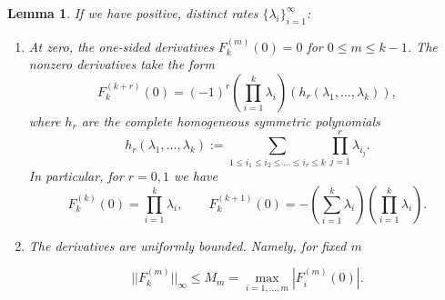 \documentclass[10pt,oneside,reqno]{article}
\theoremstyle{plain}
\newtheorem{lemma}[theorem]{Lemma}
\theoremstyle{definition}
\numberwithin{equation}{section}
\renewcommand{\leq}{\leqslant}
\begin{document}
\begin{lemma}
    If we have positive, distinct rates $\{\lambda_i\}_{i = 1}^\infty$:

    \begin{enumerate}[label=(\roman*)]
        \item At zero, the one-sided derivatives $F_k^{(m)}(0) = 0$ for $0 \leq m \leq k-1$. The nonzero derivatives take the form
        \[F_{k}^{{(k + r)}}(0) = (-1)^r \left(\prod_{i=1}^k \lambda_i\right) \left(h_r(\lambda_1,..., \lambda_k)\right),\]
        \noindent where $h_r$ are the complete homogeneous symmetric polynomials
        \[ h_r(\lambda_1, ..., \lambda_k) := \sum_{1\leq i_1\leq i_2 \leq ...\leq i_r\leq k} \prod_{j=1}^r \lambda_{i_j}.\]
        \noindent In particular, for $r=0, 1$ we have
            \[F_k^{(k)}(0) = \prod_{i=1}^k \lambda_i, \qquad F_k^{(k+1)}(0) = -\left(\sum_{i=1}^k \lambda_i\right)\left(\prod_{i=1}^k \lambda_i\right).\]
        \item The derivatives are uniformly bounded. Namely, for fixed $m$
        
        \[||F_k^{(m)}||_\infty \leq M_m = \max_{i=1, ...,m} |F_i^{(m)}(0)|.\]

    \end{enumerate}


    \label{lem:hypoexponential_derivative_properties}
\end{lemma}
\end{document}
